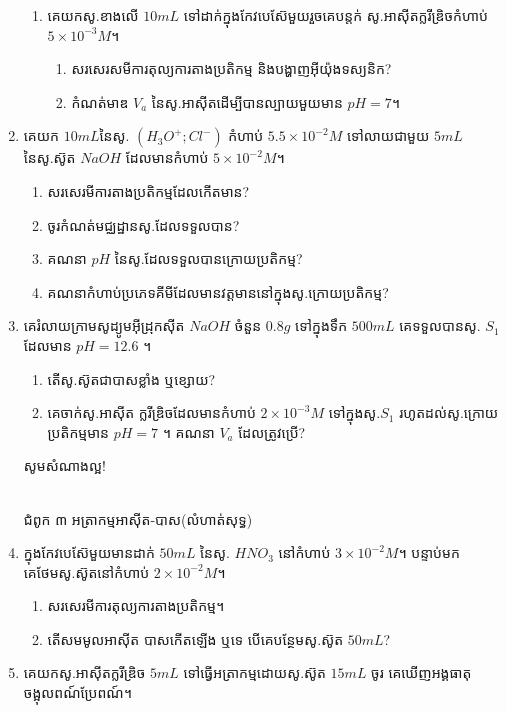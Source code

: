 \documentclass[12pt, a5paper]{article}
\begin{document}
\begin{enumerate}[m]
\begin{enumerate}[k]
		\item គេយកសូ.ខាងលើ $10mL$ ទៅដាក់ក្នុងកែវបេស៊ែមួយរួចគេបន្តក់ សូ.អាស៊ីតក្លរីឌ្រិចកំហាប់ $5\times10^{-3}M$។
		\begin{enumerate}[a]
			\item សរសេរសមីការតុល្យការតាងប្រតិកម្ម និងបង្ហាញអ៊ីយ៉ុងទស្យនិក?
			\item កំណត់មាឌ $V_a$ នៃសូ.អាស៊ីតដើម្បីបានល្បាយមួយមាន $pH=7$។
		\end{enumerate}
	\end{enumerate}
	\item គេយក $10mL$នៃសូ. $(H_3O^+ ; Cl^-)$ កំហាប់ $5.5\times10^{-2}M$ ទៅលាយជាមួយ $5mL$ នៃសូ.ស៊ូត $NaOH$ ដែលមានកំហាប់ $5\times10^{-2}M$។
	\begin{enumerate}[k]
		\item សរសេរមីការតាងប្រតិកម្មដែលកើតមាន?
		\item ចូរកំណត់មជ្ឈដ្ឋានសូ.ដែលទទួលបាន?
		\item គណនា $pH$ នៃសូ.ដែលទទួលបានក្រោយប្រតិកម្ម?
		\item គណនាកំហាប់ប្រភេទគីមីដែលមានវត្តមាននៅក្នុងសូ.ក្រោយប្រតិកម្ម?
	\end{enumerate}
	\item គេរំលាយក្រាមសូដ្យូមអ៊ីដ្រុកស៊ីត $NaOH$ ចំនួន $0.8g$ ទៅក្នុងទឹក $500mL$ គេទទួលបានសូ. $S_1$ ដែលមាន $pH=12.6$ ។
	\begin{enumerate}[k]
		\item តើសូ.ស៊ូតជាបាសខ្លាំង ឬខ្សោយ?
		\item គេចាក់សូ.អាស៊ីត ក្លរីឌ្រិចដែលមានកំហាប់ $2\times10^{-3}M$ ទៅក្នុងសូ.$S_1$ រហូតដល់សូ.ក្រោយប្រតិកម្មមាន $pH=7$ ។ គណនា $V_a$ ដែលត្រូវប្រើ?
	\end{enumerate}
	\begin{center}
		\sffamily\color{black}
		សូមសំណាងល្អ!
	\end{center}\newpage
	\begin{center}
		\sffamily\color{black}
		\\
		ជំពូក ៣ អត្រាកម្មអាស៊ីត-បាស(លំហាត់សុទ្ធ)
	\end{center}
	\item ក្នុងកែវបេស៊ែមួយមានដាក់ $50mL$ នៃសូ. $HNO_3$ នៅកំហាប់ $3\times10^{-2}M$។ បន្ទាប់មកគេថែមសូ.ស៊ូតនៅកំហាប់ $2\times10^{-2}M$។
	\begin{enumerate}[k]
		\item សរសេរមីការតុល្យការតាងប្រតិកម្ម។
		\item តើសមមូលអាស៊ីត បាសកើតឡើង ឬទេ បើគេបន្ថែមសូ.ស៊ូត $50mL$?
	\end{enumerate}
	\item គេយកសូ.អាស៊ីតក្លរីឌ្រិច $5mL$ ទៅធ្វើអត្រាកម្មដោយសូ.ស៊ូត $15mL$ ចូរ គេឃើញអង្គធាតុចង្អុលពណ៍ប្រែពណ៍។

\end{enumerate}
\end{document}
